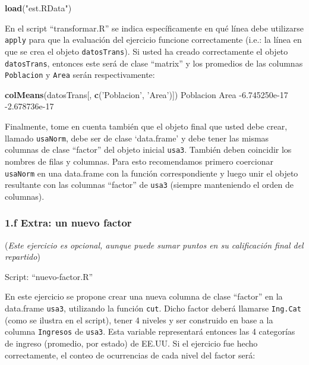 \documentclass[]{article}
\newenvironment{Shaded}{}{}
\newcommand{\KeywordTok}[1]{\textcolor[rgb]{0.00,0.44,0.13}{\textbf{{#1}}}}
\newcommand{\FloatTok}[1]{\textcolor[rgb]{0.25,0.63,0.44}{{#1}}}
\newcommand{\StringTok}[1]{\textcolor[rgb]{0.25,0.44,0.63}{{#1}}}
\newcommand{\NormalTok}[1]{{#1}}
\begin{document}
\begin{Shaded}
\begin{Highlighting}[]
\KeywordTok{load}\NormalTok{(}\StringTok{"est.RData"}\NormalTok{)}
\end{Highlighting}
\end{Shaded}
En el script ``transformar.R'' se indica específicamente en qué línea
debe utilizarse \texttt{apply} para que la evaluación del ejercicio
funcione correctamente (i.e.: la línea en que se crea el objeto
\texttt{datosTrans}). Si usted ha creado correctamente el objeto
\texttt{datosTrans}, entonces este será de clase ``matrix'' y los
promedios de las columnas \texttt{Poblacion} y \texttt{Area} serán
respectivamente:

\begin{Shaded}
\begin{Highlighting}[]
\KeywordTok{colMeans}\NormalTok{(datosTrans[, }\KeywordTok{c}\NormalTok{(}\StringTok{'Poblacion'}\NormalTok{, }\StringTok{'Area'}\NormalTok{)])}
    \NormalTok{Poblacion          Area }
\NormalTok{-}\FloatTok{6.745250e-17} \NormalTok{-}\FloatTok{2.678736e-17}
\end{Highlighting}
\end{Shaded}
Finalmente, tome en cuenta también que el objeto final que usted debe
crear, llamado \texttt{usaNorm}, debe ser de clase `data.frame' y debe
tener las mismas columnas de clase ``factor'' del objeto inicial
\texttt{usa3}. También deben coincidir los nombres de filas y columnas.
Para esto recomendamos primero coercionar \texttt{usaNorm} en una
data.frame con la función correspondiente y luego unir el objeto
resultante con las columnas ``factor'' de \texttt{usa3} (siempre
manteniendo el orden de columnas).

\subsubsection{1.f Extra: un nuevo factor}

(\emph{Este ejercicio es opcional, aunque puede sumar puntos en su
calificación final del repartido})

Script: ``nuevo-factor.R''

En este ejercicio se propone crear una nueva columna de clase ``factor''
en la data.frame \texttt{usa3}, utilizando la función \texttt{cut}.
Dicho factor deberá llamarse \texttt{Ing.Cat} (como se ilustra en el
script), tener 4 niveles y ser construido en base a la columna
\texttt{Ingresos} de \texttt{usa3}. Esta variable representará entonces
las 4 categorías de ingreso (promedio, por estado) de EE.UU. Si el
ejercicio fue hecho correctamente, el conteo de ocurrencias de cada
nivel del factor será:
\end{document}
